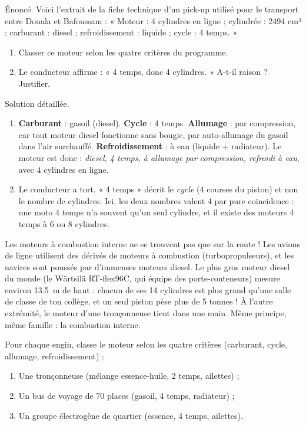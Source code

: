 \documentclass[11pt]{article}
\begin{document}
\begin{exoresolu}
Énoncé. Voici l'extrait de la fiche technique d'un pick-up utilisé pour le transport entre Douala et Bafoussam : « Moteur : 4 cylindres en ligne ; cylindrée : \num{2494} cm³ ; carburant : diesel ; refroidissement : liquide ; cycle : 4 temps. »
\begin{enumerate}
\item Classer ce moteur selon les quatre critères du programme.
\item Le conducteur affirme : « 4 temps, donc 4 cylindres. » A-t-il raison ? Justifier.
\end{enumerate}
\tcblower
Solution détaillée.
\begin{enumerate}
\item \textbf{Carburant} : gasoil (diesel). \textbf{Cycle} : 4 temps. \textbf{Allumage} : par compression, car tout moteur diesel fonctionne sans bougie, par auto-allumage du gasoil dans l'air surchauffé. \textbf{Refroidissement} : à eau (liquide + radiateur). Le moteur est donc : \emph{diesel, 4 temps, à allumage par compression, refroidi à eau}, avec 4 cylindres en ligne.
\item Le conducteur a tort. « 4 temps » décrit le \emph{cycle} (4 courses du piston) et non le nombre de cylindres. Ici, les deux nombres valent 4 par pure coïncidence : une moto 4 temps n'a souvent qu'un seul cylindre, et il existe des moteurs 4 temps à 6 ou 8 cylindres.
\end{enumerate}
\end{exoresolu}

\begin{savaistu}
Les moteurs à combustion interne ne se trouvent pas que sur la route ! Les avions de ligne utilisent des dérivés de moteurs à combustion (turbopropulseurs), et les navires sont poussés par d'immenses moteurs diesel. Le plus gros moteur diesel du monde (le Wärtsilä RT-flex96C, qui équipe des porte-conteneurs) mesure environ \SI{13,5}{m} de haut : chacun de ses 14 cylindres est plus grand qu'une salle de classe de ton collège, et un seul piston pèse plus de 5 tonnes ! À l'autre extrémité, le moteur d'une tronçonneuse tient dans une main. Même principe, même famille : la combustion interne.
\end{savaistu}

\begin{exercice}
Pour chaque engin, classe le moteur selon les quatre critères (carburant, cycle, allumage, refroidissement) :
\begin{enumerate}
\item Une tronçonneuse (mélange essence-huile, 2 temps, ailettes) ;
\item Un bus de voyage de 70 places (gasoil, 4 temps, radiateur) ;
\item Un groupe électrogène de quartier (essence, 4 temps, ailettes).
\end{enumerate}
\end{exercice}
\end{document}
